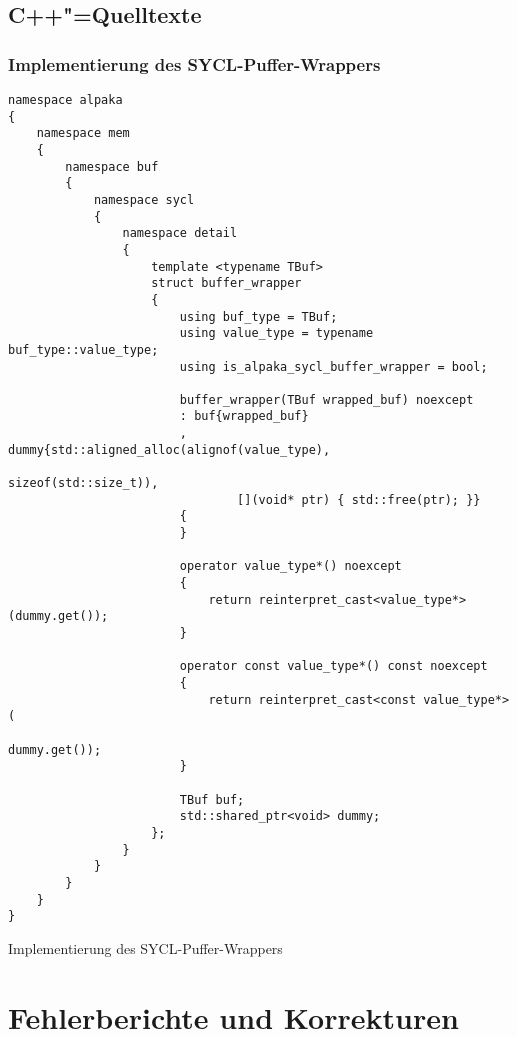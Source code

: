 \section{C++"=Quelltexte}
\label{anhang:source:cpp}

\subsection{Implementierung des SYCL-Puffer-Wrappers}
\label{anhang:source:cpp:bufferwrapper}

\begin{code}
    \begin{verbatim}
namespace alpaka
{
    namespace mem
    {
        namespace buf
        {
            namespace sycl
            {
                namespace detail
                {
                    template <typename TBuf>
                    struct buffer_wrapper
                    {
                        using buf_type = TBuf;
                        using value_type = typename buf_type::value_type;
                        using is_alpaka_sycl_buffer_wrapper = bool;

                        buffer_wrapper(TBuf wrapped_buf) noexcept
                        : buf{wrapped_buf}
                        , dummy{std::aligned_alloc(alignof(value_type),
                                                   sizeof(std::size_t)),
                                [](void* ptr) { std::free(ptr); }}
                        {
                        }

                        operator value_type*() noexcept
                        {
                            return reinterpret_cast<value_type*>(dummy.get());
                        }

                        operator const value_type*() const noexcept
                        {
                            return reinterpret_cast<const value_type*>(
                                                                dummy.get());
                        }

                        TBuf buf;
                        std::shared_ptr<void> dummy;
                    };
                }
            }
        }
    }
}
    \end{verbatim}
    \caption{Implementierung des SYCL-Puffer-Wrappers}
\end{code}

\chapter{Fehlerberichte und Korrekturen}
\label{anhang:fehler}


